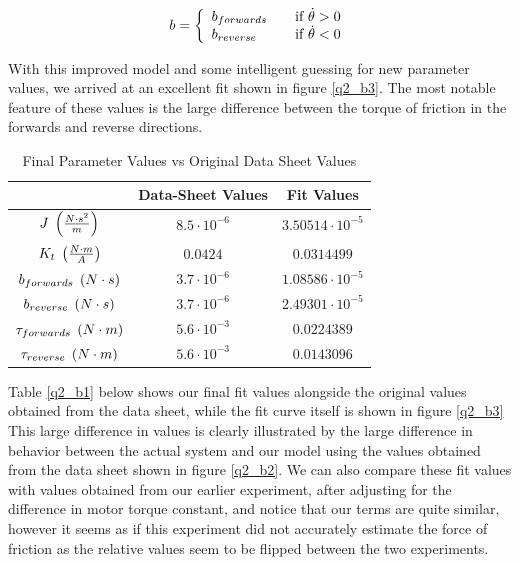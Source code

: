 \documentclass{article}
\theoremstyle{plain}
\theoremstyle{definition}
\theoremstyle{remark}
\begin{document}
\[
b = \left\{
\begin{array}{l l}
b_{forwards} & \quad \text{if } \dot{\theta} > 0 \\
b_{reverse} & \quad  \text{if } \dot{\theta} < 0 \\
\end{array} \right.
\]

With this improved model and some intelligent guessing for new parameter values, we arrived at an excellent fit shown in figure \ref{q2_b3}. The most notable feature of these values is the large difference between the torque of friction in the forwards and reverse directions. \\ 

\begin{table}[htb]
\begin{center}
    \begin{tabular}{|c|c|c|}
        \hline
        ~                 & Data-Sheet Values    & Fit Values              \\ \hline
        $J \hspace{0.1cm} \left( \frac{N \cdot s^2}{m} \right)$               & $8.5 \cdot 10^{-6} $     & $3.50514 \cdot 10^{-5}$ \\ 
        $K_{t} \hspace{0.1cm} \left( \frac{N\cdot m}{A} \right)$           & $0.0424$             & $0.0314499$             \\ 
        $b_{forwards} \hspace{0.1cm} \left( N \cdot s \right)$    & $3.7 \cdot 10^{-6} $ & $1.08586 \cdot 10^{-5}$ \\ 
        $b_{reverse} \hspace{0.1cm} \left( N \cdot s \right)$     & $3.7 \cdot 10^{-6} $ & $2.49301 \cdot 10^{-5}$ \\ 
        $\tau_{forwards} \hspace{0.1cm} \left( N \cdot m \right)$ & $5.6 \cdot 10^{-3}$  & $0.0224389$             \\ 
        $\tau_{reverse} \hspace{0.1cm} \left( N \cdot m \right)$   & $5.6 \cdot 10^{-3}$  & $0.0143096$             \\
        \hline
    \end{tabular}
\caption{Final Parameter Values vs Original Data Sheet Values}
\label{q2_b8}
\end{center}
\end{table}

Table \ref{q2_b1} below shows our final fit values alongside the original values obtained from the data sheet, while the fit curve itself is shown in figure \ref{q2_b3}  This large difference in values is clearly illustrated by the large difference in behavior between the actual system and our model using the values obtained from the data sheet shown in figure \ref{q2_b2}.  We can also compare these fit values with values obtained from our earlier experiment, after adjusting for the difference in motor torque constant, and notice that our terms are quite similar, however it seems as if this experiment did not accurately estimate the force of friction as the relative values seem to be flipped between the two experiments.\\
\end{document}
